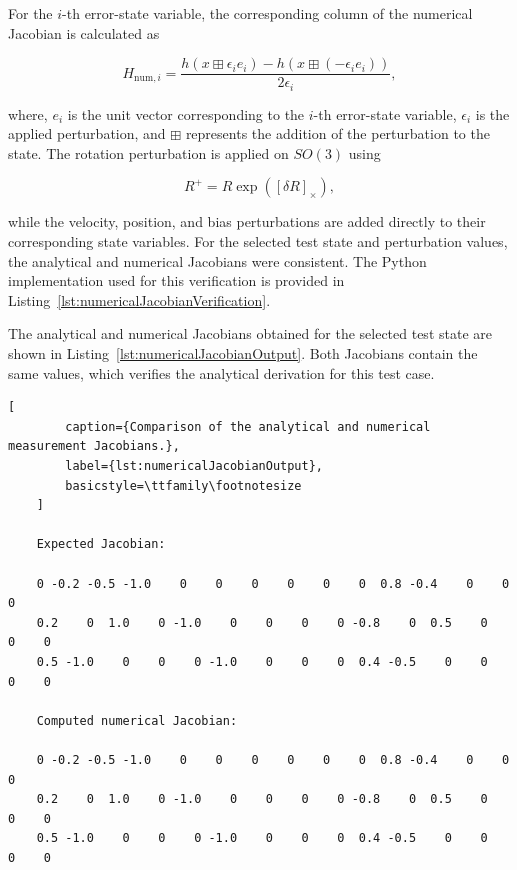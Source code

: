 \documentclass[report.tex]{subfiles}
\begin{document}
    For the $i$-th error-state variable, the corresponding column of the numerical
    Jacobian is calculated as

    \begin{equation}
        H_{\mathrm{num},i}
        =
        \frac{
            h\left(x\boxplus\epsilon_i e_i\right)
            -
            h\left(x\boxplus(-\epsilon_i e_i)\right)
        }{2\epsilon_i},
        \label{eq:numericalJacobianCentralDifference}
    \end{equation}

    where, $e_i$ is the unit vector corresponding to the $i$-th error-state variable, $\epsilon_i$ is the applied perturbation, and $\boxplus$ represents the addition of the perturbation to the state. The rotation perturbation is applied on $SO(3)$ using

    \begin{equation}
        R^{+}
        =
        R\exp\left([\delta R]_{\times}\right),
    \end{equation}

    while the velocity, position, and bias perturbations are added directly to their corresponding state variables. For the selected test state and perturbation values, the analytical and numerical Jacobians were consistent. The Python implementation used for this verification is provided in Listing~\ref{lst:numericalJacobianVerification}.

    

    The analytical and numerical Jacobians obtained for the selected test state are shown in Listing~\ref{lst:numericalJacobianOutput}. Both Jacobians contain the same values, which verifies the analytical derivation for this test case.

    
    \begin{lstlisting}[
        caption={Comparison of the analytical and numerical measurement Jacobians.},
        label={lst:numericalJacobianOutput},
        basicstyle=\ttfamily\footnotesize
    ]
    
    Expected Jacobian:

    0 -0.2 -0.5 -1.0    0    0    0    0    0    0  0.8 -0.4    0    0    0
    0.2    0  1.0    0 -1.0    0    0    0    0 -0.8    0  0.5    0    0    0
    0.5 -1.0    0    0    0 -1.0    0    0    0  0.4 -0.5    0    0    0    0

    Computed numerical Jacobian:

    0 -0.2 -0.5 -1.0    0    0    0    0    0    0  0.8 -0.4    0    0    0
    0.2    0  1.0    0 -1.0    0    0    0    0 -0.8    0  0.5    0    0    0
    0.5 -1.0    0    0    0 -1.0    0    0    0  0.4 -0.5    0    0    0    0
    \end{lstlisting}
\end{document}
